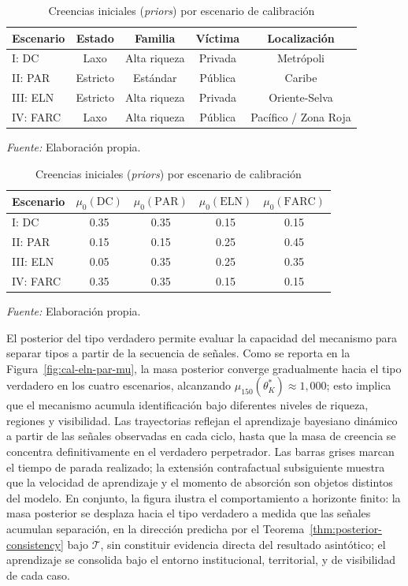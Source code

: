 \documentclass[review,authoryear,12pt]{elsarticle}
\theoremstyle{plain}
\theoremstyle{definition}
\newcommand{\1}{\mathbf{1}}
\begin{document}
\begin{table}[!ht]
\centering
\small
\caption{Parámetros y covariables por escenario de calibración}
\label{tab:covariables-escenarios}
\begin{tabular}{lcccc}
\toprule
Escenario & Estado & Familia & Víctima & Localización \\ \midrule
I: DC & Laxo & Alta riqueza & Privada & Metrópoli \\
II: PAR & Estricto & Estándar & Pública & Caribe \\
III: ELN & Estricto & Alta riqueza & Privada & Oriente-Selva \\
IV: FARC & Laxo & Alta riqueza & Pública & Pacífico / Zona Roja \\ \bottomrule
\end{tabular}
\par\smallskip\footnotesize \textit{Fuente:} Elaboración propia.

\vspace{24pt}

\caption{Creencias iniciales (\emph{priors}) por escenario de calibración}
\label{tab:priors-escenarios}
\begin{tabular}{lcccc}
\toprule
Escenario & $\mu_0(\mathrm{DC})$ & $\mu_0(\mathrm{PAR})$ & $\mu_0(\mathrm{ELN})$ & $\mu_0(\mathrm{FARC})$ \\ \midrule
I: DC & 0.35 & 0.35 & 0.15 & 0.15 \\
II: PAR & 0.15 & 0.15 & 0.25 & 0.45 \\
III: ELN & 0.05 & 0.35 & 0.25 & 0.35 \\
IV: FARC & 0.35 & 0.35 & 0.15 & 0.15 \\ \bottomrule
\end{tabular}
\par\smallskip\footnotesize \textit{Fuente:} Elaboración propia.
\end{table}

El posterior del tipo verdadero permite evaluar la capacidad del mecanismo para separar tipos a partir de la secuencia de señales. Como se reporta en la Figura~\ref{fig:cal-eln-par-mu}, la masa posterior converge gradualmente hacia el tipo verdadero en los cuatro escenarios, alcanzando $\mu_{150}(\theta_K^\ast)\approx 1{,}000$; esto implica que el mecanismo acumula identificación bajo diferentes niveles de riqueza, regiones y visibilidad. Las trayectorias reflejan el aprendizaje bayesiano dinámico a partir de las señales observadas en cada ciclo, hasta que la masa de creencia se concentra definitivamente en el verdadero perpetrador. Las barras grises marcan el tiempo de parada realizado; la extensión contrafactual subsiguiente muestra que la velocidad de aprendizaje y el momento de absorción son objetos distintos del modelo. En conjunto, la figura ilustra el comportamiento a horizonte finito: la masa posterior se desplaza hacia el tipo verdadero a medida que las señales acumulan separación, en la dirección predicha por el Teorema~\ref{thm:posterior-consistency} bajo $\mathcal{T}$, sin constituir evidencia directa del resultado asintótico; el aprendizaje se consolida bajo el entorno institucional, territorial, y de visibilidad de cada caso.
\end{document}
